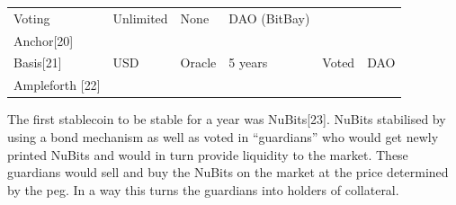 \documentclass[english,]{IEEEtran}
\begin{document}
\begin{longtable}[]{@{}llllll@{}}
\begin{minipage}[t]{0.19\columnwidth}
Voting\strut
\end{minipage} & \begin{minipage}[t]{0.09\columnwidth}\raggedright\strut
Unlimited\strut
\end{minipage} & \begin{minipage}[t]{0.08\columnwidth}\raggedright\strut
None\strut
\end{minipage} & \begin{minipage}[t]{0.15\columnwidth}\raggedright\strut
DAO (BitBay)\strut
\end{minipage}\tabularnewline
\begin{minipage}[t]{0.27\columnwidth}\raggedright\strut
Anchor{[}20{]}\strut
\end{minipage} & \begin{minipage}[t]{0.06\columnwidth}\raggedright\strut
\strut
\end{minipage}\tabularnewline
\begin{minipage}[t]{0.27\columnwidth}\raggedright\strut
Basis{[}21{]}\strut
\end{minipage} & \begin{minipage}[t]{0.06\columnwidth}\raggedright\strut
USD\strut
\end{minipage} & \begin{minipage}[t]{0.19\columnwidth}\raggedright\strut
Oracle\strut
\end{minipage} & \begin{minipage}[t]{0.09\columnwidth}\raggedright\strut
5 years\strut
\end{minipage} & \begin{minipage}[t]{0.08\columnwidth}\raggedright\strut
Voted\strut
\end{minipage} & \begin{minipage}[t]{0.15\columnwidth}\raggedright\strut
DAO\strut
\end{minipage}\tabularnewline
\begin{minipage}[t]{0.27\columnwidth}\raggedright\strut
Ampleforth {[}22{]}\strut
\end{minipage} & \begin{minipage}[t]{0.06\columnwidth}\raggedright\strut
\strut
\end{minipage}\tabularnewline
\bottomrule
\end{longtable}

The first stablecoin to be stable for a year was NuBits{[}23{]}. NuBits
stabilised by using a bond mechanism as well as voted in ``guardians''
who would get newly printed NuBits and would in turn provide liquidity
to the market. These guardians would sell and buy the NuBits on the
market at the price determined by the peg. In a way this turns the
guardians into holders of collateral.
\end{document}
